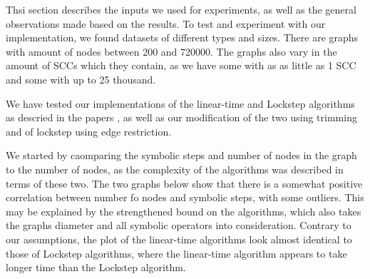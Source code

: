 \documentclass[../master/master.tex]{subfiles}
\begin{document}
Thsi section describes the inputs we used for experiments, as well as the general observations made based on the results. To test and experiment with our implementation, we found datasets of different types and sizes. There are graphs with amount of nodes between 200 and 720000. The graphs also vary in the amount of SCCs which they contain, as we have some with as as little as 1 SCC and some with up to 25 thousand.

We have tested our implementations of the linear-time and Lockstep algorithms as descried in the papers \cite{linear}\cite{lockstep}, as well as our modification of the two using trimming and of lockstep using edge restriction.

We started by caomparing the symbolic steps and number of nodes in the graph to the number of nodes, as the complexity of the algorithms was described in terms of these two. The two graphs below show that there is a somewhat positive correlation between number fo nodes and symbolic steps, with some outliers. This may be explained by the strengthened bound on the algorithms, which also takes the graphs diameter and all symbolic operators into consideration.  Contrary to our assumptions, the plot of the linear-time algorithms look almost identical to those of Lockstep algorithms, where the linear-time algorithm appears to take longer time than the Lockstep algorithm.

\end{document}
